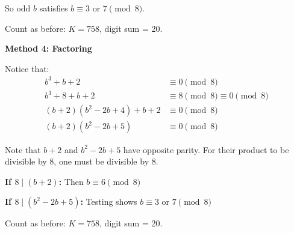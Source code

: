 \documentclass[11pt]{article}
\begin{document}
\begin{solutionbox}
So odd $b$ satisfies $b \equiv 3$ or $7 \pmod{8}$.

Count as before: $K = 758$, digit sum = 20.

\textbf{Method 4: Factoring}

Notice that:
\begin{align*}
b^3 + b + 2 &\equiv 0 \pmod{8} \\
b^3 + 8 + b + 2 &\equiv 8 \pmod{8} \equiv 0 \pmod{8} \\
(b+2)(b^2-2b+4) + b + 2 &\equiv 0 \pmod{8} \\
(b+2)(b^2-2b+5) &\equiv 0 \pmod{8}
\end{align*}

Note that $b+2$ and $b^2-2b+5$ have opposite parity. For their product to be divisible by 8, one must be divisible by 8.

\textbf{If $8 \mid (b+2)$:} Then $b \equiv 6 \pmod{8}$

\textbf{If $8 \mid (b^2-2b+5)$:} Testing shows $b \equiv 3$ or $7 \pmod{8}$

Count as before: $K = 758$, digit sum = 20.

\end{solutionbox}
\end{document}
